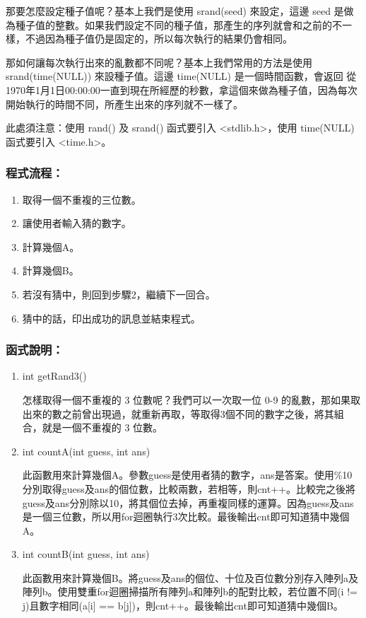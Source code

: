 \documentclass[12pt,a4paper]{article}
\begin{document}
那要怎麼設定種子值呢？基本上我們是使用 srand(seed) 來設定，這邊 seed 是做為種子值的整數。如果我們設定不同的種子值，那產生的序列就會和之前的不一樣，不過因為種子值仍是固定的，所以每次執行的結果仍會相同。

那如何讓每次執行出來的亂數都不同呢？基本上我們常用的方法是使用 srand(time(NULL)) 來設種子值。這邊 time(NULL) 是一個時間函數，會返回
從1970年1月1日00:00:00一直到現在所經歷的秒數，拿這個來做為種子值，因為每次開始執行的時間不同，所產生出來的序列就不一樣了。

此處須注意：使用 rand() 及 srand() 函式要引入 <stdlib.h>，使用 time(NULL) 函式要引入 <time.h>。
\subsubsection{程式流程：}
\begin{enumerate}
	\item 取得一個不重複的三位數。
	\item 讓使用者輸入猜的數字。
	\item 計算幾個A。
	\item 計算幾個B。
	\item 若沒有猜中，則回到步驟2，繼續下一回合。
	\item 猜中的話，印出成功的訊息並結束程式。
\end{enumerate}

\subsubsection{函式說明：}
\vspace{0.5cm}
\begin{enumerate}
	\item int getRand3()
	
	怎樣取得一個不重複的 3 位數呢？我們可以一次取一位 0-9 的亂數，那如果取出來的數之前曾出現過，就重新再取，等取得3個不同的數字之後，將其組合，就是一個不重複的 3 位數。

	\item int countA(int guess, int ans)
	
	此函數用來計算幾個A。參數guess是使用者猜的數字，ans是答案。使用\%10分別取得guess及ans的個位數，比較兩數，若相等，則cnt++。比較完之後將guess及ans分別除以10，將其個位去掉，再重複同樣的運算。因為guess及ans是一個三位數，所以用for迴圈執行3次比較。最後輸出cnt即可知道猜中幾個A。
	
	\item int countB(int guess, int ans)
	
	此函數用來計算幾個B。將guess及ans的個位、十位及百位數分別存入陣列a及陣列b。使用雙重for迴圈掃描所有陣列a和陣列b的配對比較，若位置不同(i != j)且數字相同(a[i] == b[j])，則cnt++。最後輸出cnt即可知道猜中幾個B。
\end{enumerate}
\end{document}
